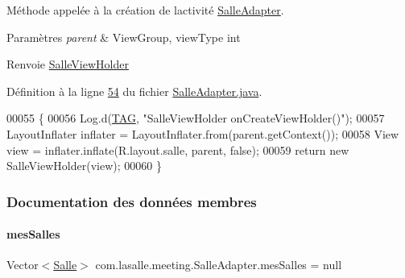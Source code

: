 Méthode appelée à la création de l\textquotesingle{}activité \hyperlink{classcom_1_1lasalle_1_1meeting_1_1_salle_adapter}{Salle\+Adapter}. 


\begin{DoxyParams}{Paramètres}
{\em parent} & View\+Group, view\+Type int \\
\hline
\end{DoxyParams}
\begin{DoxyReturn}{Renvoie}
\hyperlink{classcom_1_1lasalle_1_1meeting_1_1_salle_view_holder}{Salle\+View\+Holder} 
\end{DoxyReturn}


Définition à la ligne \hyperlink{_salle_adapter_8java_source_l00054}{54} du fichier \hyperlink{_salle_adapter_8java_source}{Salle\+Adapter.\+java}.


\begin{DoxyCode}
00055     \{
00056         Log.d(\hyperlink{classcom_1_1lasalle_1_1meeting_1_1_salle_adapter_a774947591a1beedaffd58989783206b1}{TAG}, \textcolor{stringliteral}{"SalleViewHolder onCreateViewHolder()"});
00057         LayoutInflater inflater = LayoutInflater.from(parent.getContext());
00058         View view = inflater.inflate(R.layout.salle, parent, \textcolor{keyword}{false});
00059         \textcolor{keywordflow}{return} \textcolor{keyword}{new} SalleViewHolder(view);
00060     \}
\end{DoxyCode}


\subsubsection{Documentation des données membres}
\mbox{\label{classcom_1_1lasalle_1_1meeting_1_1_salle_adapter_a3988ff211fbf3052b553d77ba0711a5a}} 
\paragraph{\texorpdfstring{mes\+Salles}{mesSalles}}
{\footnotesize\ttfamily Vector$<$\hyperlink{classcom_1_1lasalle_1_1meeting_1_1_salle}{Salle}$>$ com.\+lasalle.\+meeting.\+Salle\+Adapter.\+mes\+Salles = null\hspace{0.3cm}{\ttfamily [private]}}




